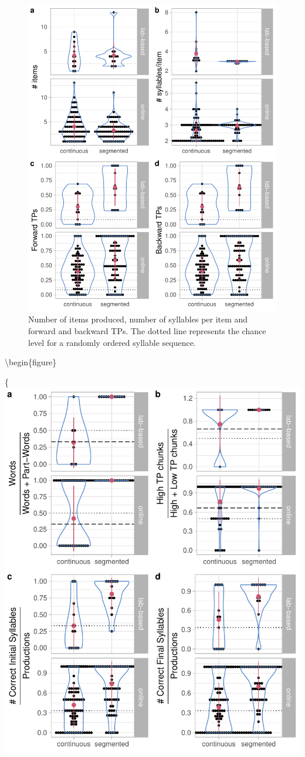 \documentclass[]{article}
\begin{document}
\begin{figure}

{\centering \includegraphics[width=0.8\linewidth]{segmentation_recall_combined_files/figure-latex/recall-general-measures-tp-plot-1} 

}

\caption{Number of items produced, number of syllables per item and forward and backward TPs. The dotted line represents the chance level for a randomly ordered syllable sequence.}\label{fig:recall-general-measures-tp-plot}
\end{figure}

\textbackslash{}begin\{figure\}

\{\centering \includegraphics[width=0.8\linewidth]{segmentation_recall_combined_files/figure-latex/recall-w-pw-chunks-positions-plot-1}
\end{document}
